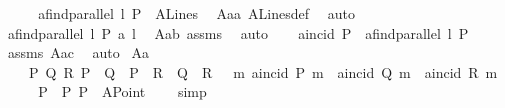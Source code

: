 \begin{isabellebody}
%
\isadelimproof
%
\endisadelimproof
%
\isatagproof
{}\isamarkupfalse%
\ {\isacharminus}{\kern0pt}\isanewline
\ \ \isamarkupfalse%
\ {\isachardoublequoteopen}a{}find{\isacharunderscore}{\kern0pt}parallel\ l\ P\ {\isasymin}\ A{}Lines{\isachardoublequoteclose}\ \isamarkupfalse%
\ A{}{\isacharunderscore}{\kern0pt}a{}a\ A{}Lines{\isacharunderscore}{\kern0pt}def\ \isamarkupfalse%
\ auto\ \isanewline
\ \ \isamarkupfalse%
\ {\isachardoublequoteopen}{\isacharparenleft}{\kern0pt}a{}find{\isacharunderscore}{\kern0pt}parallel\ l\ P{\isacharparenright}{\kern0pt}\ a{}{\isacharbar}{\kern0pt}{\isacharbar}{\kern0pt}\ l{\isachardoublequoteclose}\ \isamarkupfalse%
\ A{}{\isacharunderscore}{\kern0pt}a{}b\ assms\ \isamarkupfalse%
\ auto\isanewline
\ \ \isamarkupfalse%
\ {\isachardoublequoteopen}a{}incid\ P\ \ {\isacharparenleft}{\kern0pt}a{}find{\isacharunderscore}{\kern0pt}parallel\ l\ P{\isacharparenright}{\kern0pt}{\isachardoublequoteclose}\ \isamarkupfalse%
\ assms\ A{}{\isacharunderscore}{\kern0pt}a{}c\ \isamarkupfalse%
\ auto\isanewline
{}\isamarkupfalse%
%
\endisatagproof
{\isafoldproof}%
%
\isadelimproof
\isanewline
%
\endisadelimproof
\isanewline
\isanewline
{}\isamarkupfalse%
\ A{}{\isacharunderscore}{\kern0pt}a{}{\isacharcolon}{\kern0pt}\isanewline
\ \ \ \ {\isachardoublequoteopen}{\isasymexists}P\ Q\ R{\isachardot}{\kern0pt}\ P\ {\isasymnoteq}\ Q\ {\isasymand}\ P\ {\isasymnoteq}\ R\ {\isasymand}\ Q\ {\isasymnoteq}\ R\ {\isasymand}\ {\isacharparenleft}{\kern0pt}{\isasymnexists}\ m{\isachardot}{\kern0pt}\ a{}incid\ P\ m\ {\isasymand}\ a{}incid\ Q\ m\ {\isasymand}\ a{}incid\ R\ m{\isacharparenright}{\kern0pt}{\isachardoublequoteclose}\isanewline
%
\isadelimproof
%
\endisadelimproof
%
\isatagproof
{}\isamarkupfalse%
\ {\isacharminus}{\kern0pt}\isanewline
\ \ \isamarkupfalse%
\ P\ \ P{\isacharcolon}{\kern0pt}\ {\isachardoublequoteopen}P\ {\isacharequal}{\kern0pt}\ {\isacharparenleft}{\kern0pt}A{}Point\ {}\ {}{\isacharparenright}{\kern0pt}{\isachardoublequoteclose}\ \isamarkupfalse%
\ simp\isanewline

\end{isabellebody}
